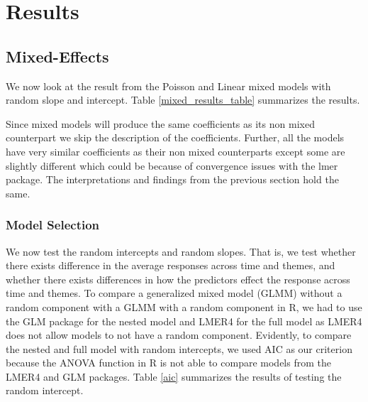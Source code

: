 \section{Results}
\subsection{Mixed-Effects}
We now look at the result from the Poisson and Linear mixed models with random slope and intercept. Table \ref{mixed_results_table} summarizes the results.

Since mixed models will produce the same coefficients as its non mixed counterpart we skip the description of the coefficients. Further, all the models have very similar coefficients as their non mixed counterparts except some are slightly different which could be because of convergence issues with the lmer package. The interpretations and findings from the previous section hold the same.
\subsubsection{Model Selection}
We now test the random intercepts and random slopes. That is, we test whether there exists difference in the average responses across time and themes, and whether there exists differences in how the predictors effect the response across time and themes.
To compare a generalized mixed model (GLMM) without a random component with a GLMM with a random component in R, we had to use the GLM package for the nested model and LMER4 for the full model as LMER4 does not allow models to not have a random component. Evidently, to compare the nested and full model with random intercepts, we used AIC as our criterion because the ANOVA function in R is not able to compare models from the LMER4 and GLM packages. Table \ref{aic} summarizes the results of testing the random intercept.

